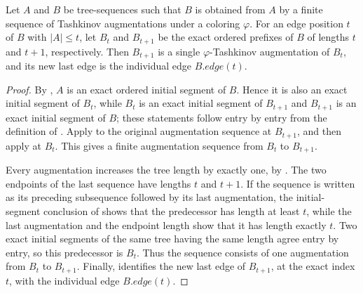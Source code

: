 \begin{helper}
Let $A$ and $B$ be tree-sequences such that $B$ is obtained from $A$ by
a finite sequence of Tashkinov augmentations under a coloring $\varphi$.
For an edge position $t$ of $B$ with $|A|\leq t$, let $B_t$ and
$B_{t+1}$ be the exact ordered prefixes of $B$ of lengths $t$ and
$t+1$, respectively.  Then $B_{t+1}$ is a single
$\varphi$-Tashkinov augmentation of $B_t$, and its new last edge is the
individual edge $B.\mathit{edge}(t)$.
\end{helper}
\begin{proof}
By , $A$ is an exact
ordered initial segment of $B$.  Hence it is also an exact initial
segment of $B_t$, while $B_t$ is an exact initial segment of $B_{t+1}$
and $B_{t+1}$ is an exact initial segment of $B$; these statements
follow entry by entry from the definition of .
Apply  to the original
augmentation sequence at $B_{t+1}$, and then apply
 at $B_t$.  This gives a
finite augmentation sequence from $B_t$ to $B_{t+1}$.

Every augmentation increases the tree length by exactly one, by
.  The two endpoints of the last sequence
have lengths $t$ and $t+1$.  If the sequence is written as its preceding
subsequence followed by its last augmentation, the initial-segment
conclusion of 
shows that the predecessor has length at least $t$, while the last
augmentation and the endpoint length show that it has length exactly
$t$.  Two exact initial segments of the same tree having the same length
agree entry by entry, so this predecessor is $B_t$.  Thus the sequence
consists of one augmentation from $B_t$ to $B_{t+1}$.  Finally,
 identifies the new last edge of
$B_{t+1}$, at the exact index $t$, with the individual edge
$B.\mathit{edge}(t)$.
\end{proof}
